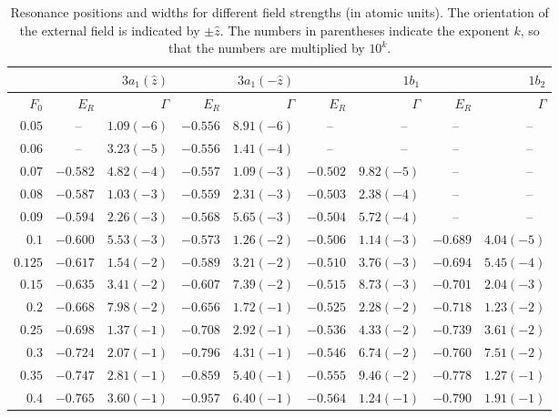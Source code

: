 \begin{table}[t]
\centering
\caption{\label{tab:3a1_results} Resonance positions and widths for
  different field strengths (in atomic units). The orientation of the
  external field is indicated by $\pm\hat{z}$. The numbers in
  parentheses indicate the exponent $k$, so that the numbers are
  multiplied by $10^{k}$.}
\begin{tabular}{rrrrrrrrr}
\toprule
&& $3a_{1}(\hat{z})$ && $3a_{1}(-\hat{z})$ && $1b_{1}$ && $1b_{2}$ \\
\midrule
$F_{0}$&$E_{R}$&$\Gamma$&$E_{R}$&$\Gamma$&$E_{R}$&$\Gamma$&$E_{R}$&$\Gamma$ \\
\midrule
$0.05$ &   --~~ &$1.09(-6)$&$-0.556$&$8.91(-6)$ & --~~ & --~~ & --~~ & --~~ \\
$0.06$ &   --~~ &$3.23(-5)$&$-0.556$&$1.41(-4)$ & --~~ & --~~ & --~~ & --~~ \\
$0.07$ &$-0.582$&$4.82(-4)$&$-0.557$&$1.09(-3)$&$-0.502$&$9.82(-5)$ & --~~ & --~~ \\
$0.08$ &$-0.587$&$1.03(-3)$&$-0.559$&$2.31(-3)$&$-0.503$&$2.38(-4)$ & --~~ & --~~ \\
$0.09$ &$-0.594$&$2.26(-3)$&$-0.568$&$5.65(-3)$&$-0.504$&$5.72(-4)$ & --~~ & --~~ \\
$0.1$  &$-0.600$&$5.53(-3)$&$-0.573$&$1.26(-2)$&$-0.506$&$1.14(-3)$&$-0.689$&$4.04(-5)$\\
$0.125$&$-0.617$&$1.54(-2)$&$-0.589$&$3.21(-2)$&$-0.510$&$3.76(-3)$&$-0.694$&$5.45(-4)$\\
$0.15$ &$-0.635$&$3.41(-2)$&$-0.607$&$7.39(-2)$&$-0.515$&$8.73(-3)$&$-0.701$&$2.04(-3)$\\
$0.2$  &$-0.668$&$7.98(-2)$&$-0.656$&$1.72(-1)$&$-0.525$&$2.28(-2)$&$-0.718$&$1.23(-2)$\\
$0.25$ &$-0.698$&$1.37(-1)$&$-0.708$&$2.92(-1)$&$-0.536$&$4.33(-2)$&$-0.739$&$3.61(-2)$\\
$0.3$  &$-0.724$&$2.07(-1)$&$-0.796$&$4.31(-1)$&$-0.546$&$6.74(-2)$&$-0.760$&$7.51(-2)$\\
$0.35$ &$-0.747$&$2.81(-1)$&$-0.859$&$5.40(-1)$&$-0.555$&$9.46(-2)$&$-0.778$&$1.27(-1)$\\
$0.4$  &$-0.765$&$3.60(-1)$&$-0.957$&$6.40(-1)$&$-0.564$&$1.24(-1)$&$-0.790$&$1.91(-1)$\\
\bottomrule
\end{tabular}
\end{table}



